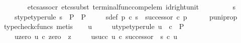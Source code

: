 \begin{isabellebody}
\ \ \ \ \ \ \isamarkupfalse%
\ {\isacharparenleft}{\kern0pt}etcs{\isacharunderscore}{\kern0pt}assocr{\isacharcomma}{\kern0pt}\ etcs{\isacharunderscore}{\kern0pt}subst\ terminal{\isacharunderscore}{\kern0pt}func{\isacharunderscore}{\kern0pt}comp{\isacharunderscore}{\kern0pt}elem\ id{\isacharunderscore}{\kern0pt}right{\isacharunderscore}{\kern0pt}unit{}{\isacharcomma}{\kern0pt}\ {\isacharminus}{\kern0pt}{\isacharparenright}{\kern0pt}\isanewline
\ \ \isamarkupfalse%
\isanewline
\ \ \isamarkupfalse%
\ \isamarkupfalse%
\ s{\isacharprime}{\kern0pt}\ \isanewline
\ \ \ \ s{\isacharprime}{\kern0pt}{\isacharunderscore}{\kern0pt}type{\isacharbrackleft}{\kern0pt}type{\isacharunderscore}{\kern0pt}rule{\isacharbrackright}{\kern0pt}{\isacharcolon}{\kern0pt}\ {\isachardoublequoteopen}s{\isacharprime}{\kern0pt}\ {\isacharcolon}{\kern0pt}\ P\ {\isasymrightarrow}\ P{\isachardoublequoteclose}\ \isanewline
\ \ \ \ s{\isacharprime}{\kern0pt}{\isacharunderscore}{\kern0pt}def{\isacharcolon}{\kern0pt}\ {\isachardoublequoteopen}p{\isacharprime}{\kern0pt}\ {\isasymcirc}\isactrlsub c\ s{\isacharprime}{\kern0pt}\ {\isacharequal}{\kern0pt}\ successor\ {\isasymcirc}\isactrlsub c\ p{\isacharprime}{\kern0pt}{\isachardoublequoteclose}\isanewline
\ \ \ \ \isamarkupfalse%
\ p{\isacharprime}{\kern0pt}{\isacharunderscore}{\kern0pt}uni{\isacharunderscore}{\kern0pt}prop\ \isamarkupfalse%
\ {\isacharparenleft}{\kern0pt}typecheck{\isacharunderscore}{\kern0pt}cfuncs{\isacharcomma}{\kern0pt}\ metis{\isacharparenright}{\kern0pt}\isanewline
\isanewline
\ \ \isamarkupfalse%
\ u\ \isanewline
\ \ \ \ u{\isacharunderscore}{\kern0pt}type{\isacharbrackleft}{\kern0pt}type{\isacharunderscore}{\kern0pt}rule{\isacharbrackright}{\kern0pt}{\isacharcolon}{\kern0pt}\ {\isachardoublequoteopen}u\ {\isacharcolon}{\kern0pt}\ {\isasymnat}\isactrlsub c\ {\isasymrightarrow}\ P{\isachardoublequoteclose}\ \isanewline
\ \ \ \ u{\isacharunderscore}{\kern0pt}zero{\isacharcolon}{\kern0pt}\ {\isachardoublequoteopen}u\ {\isasymcirc}\isactrlsub c\ zero\ {\isacharequal}{\kern0pt}\ z{\isacharprime}{\kern0pt}{\isachardoublequoteclose}\ \isanewline
\ \ \ \ u{\isacharunderscore}{\kern0pt}succ{\isacharcolon}{\kern0pt}\ {\isachardoublequoteopen}u\ {\isasymcirc}\isactrlsub c\ successor\ {\isacharequal}{\kern0pt}\ s{\isacharprime}{\kern0pt}\ {\isasymcirc}\isactrlsub c\ u{\isachardoublequoteclose}\isanewline
\ \ \ \ \isamarkupfalse%

\end{isabellebody}
